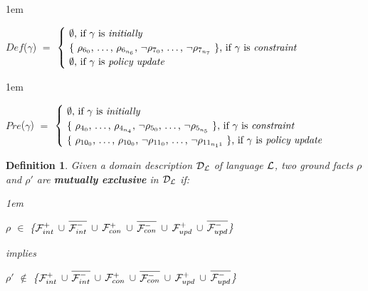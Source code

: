 \documentclass[11pt]{report}
\newtheorem{vdefinition}{Definition}[chapter]
\newenvironment{vquote}
{
  \begin{list}{}{\leftmargin 1em}\item[]
}
{
  \end{list}
}
\begin{document}
      \begin{vquote}
        $Def$($\gamma$)
        $=$
        \begin{math}
          \begin{cases}
            \mbox{
              $\emptyset$,
              if $\gamma$ is {\em initially}
            } \\
            \mbox{
              \{
                $\rho_{6_0}$, \ldots, $\rho_{6_{n_6}}$,
                $\lnot\rho_{7_0}$, \ldots, $\lnot\rho_{7_{n_7}}$
              \},
              if $\gamma$ is {\em constraint}
            } \\
            \mbox{
              $\emptyset$,
              if $\gamma$ is {\em policy update}
            } \\
          \end{cases}
        \end{math}
      \end{vquote}

      \begin{vquote}
        $Pre$($\gamma$)
        $=$
        \begin{math}
          \begin{cases}
            \mbox{
              $\emptyset$,
              if $\gamma$ is {\em initially}
            } \\
            \mbox{
              \{
                $\rho_{4_0}$, \ldots, $\rho_{4_{n_4}}$,
                $\lnot\rho_{5_0}$, \ldots, $\lnot\rho_{5_{n_5}}$
              \},
              if $\gamma$ is {\em constraint}
            } \\
            \mbox{
              \{
                $\rho_{10_0}$, \ldots, $\rho_{10_0}$,
                $\lnot\rho_{11_0}$, \ldots, $\lnot\rho_{11_{n_11}}$
              \},
              if $\gamma$ is {\em policy update}
            } \\
          \end{cases}
        \end{math}
      \end{vquote}

      \begin{vdefinition}
        \label{defn-langl-mutex}
        Given a domain description ${\cal D_{L}}$ of language ${\cal L}$,
        two ground facts $\rho$ and $\rho'$ are {\bf mutually exclusive}
        in ${\cal D_{L}}$ if:

        \begin{vquote}
          $\rho$ $\in$ \{${\cal F}^{+}_{int}$ $\cup$
          $\overline{{\cal F}^{-}_{int}}$ $\cup$ ${\cal F}^{+}_{con}$ $\cup$
          $\overline{{\cal F}^{-}_{con}}$ $\cup$ ${\cal F}^{+}_{upd}$ $\cup$
          $\overline{{\cal F}^{-}_{upd}}$\}

          implies

          $\rho'$ $\not\in$ \{${\cal F}^{+}_{int}$ $\cup$
          $\overline{{\cal F}^{-}_{int}}$ $\cup$ ${\cal F}^{+}_{con}$ $\cup$
          $\overline{{\cal F}^{-}_{con}}$ $\cup$ ${\cal F}^{+}_{upd}$ $\cup$
          $\overline{{\cal F}^{-}_{upd}}$\}
        \end{vquote}
      \end{vdefinition}
\end{document}
